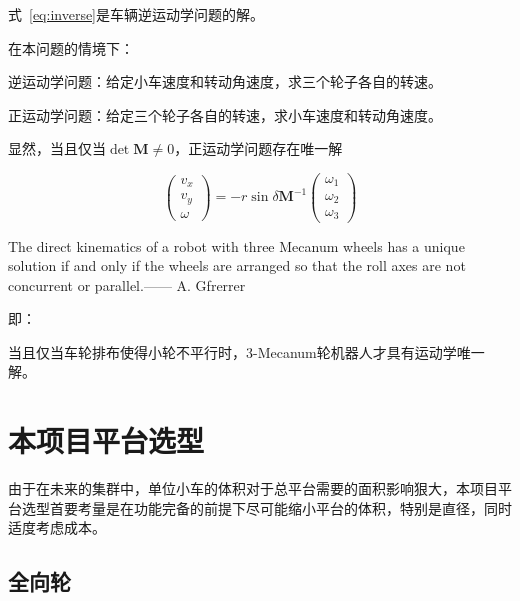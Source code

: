 式~\ref{eq:inverse}是车辆逆运动学问题的解。

在本问题的情境下：

\begin{definition}
    逆运动学问题：给定小车速度和转动角速度，求三个轮子各自的转速。
\end{definition}

\begin{definition}
    正运动学问题：给定三个轮子各自的转速，求小车速度和转动角速度。
\end{definition}

显然，当且仅当$\operatorname{det} \mathbf{M} \neq 0$，正运动学问题存在唯一解

\begin{equation}
    \left(\begin{array}{c}
    {v_{x}} \\
    {v_{y}} \\
    {\omega}
    \end{array}\right)=-r \sin \delta \mathbf{M}^{-1}\left(\begin{array}{c}
    {\omega_{1}} \\
    {\omega_{2}} \\
    {\omega_{3}}
    \end{array}\right)
\end{equation}

\begin{theorem}\label{the:theorem-en}
    The direct kinematics of a robot with three Mecanum wheels has a unique solution if and only if the wheels are arranged so that the roll axes are not concurrent or parallel.\hfill —— A. Gfrerrer
\end{theorem}

即：

\begin{theorem}\label{the:theorem-cn}
    当且仅当车轮排布使得小轮不平行时，3-Mecanum轮机器人才具有运动学唯一解。
\end{theorem}

\section{本项目平台选型}

由于在未来的集群中，单位小车的体积对于总平台需要的面积影响狠大，本项目平台选型首要考量是在功能完备的前提下尽可能缩小平台的体积，特别是直径，同时适度考虑成本。

\subsection{全向轮}

